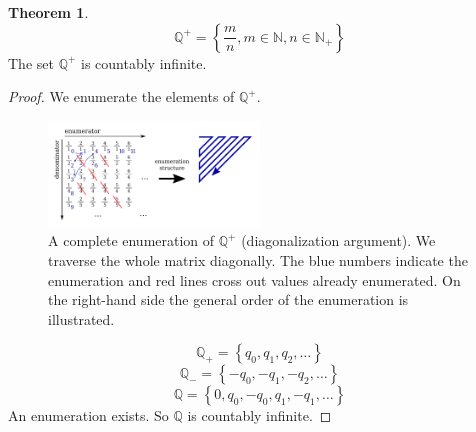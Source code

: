 \documentclass[a4paper,landscape,twocolumn]{article}
\theoremstyle{definition}
\newtheorem{theorem}{Theorem}
\newcommand\set[1]{\left\{#1\right\}}
\begin{document}
\begin{theorem}
  \[ \mathbb Q^+ = \set{\frac mn, m \in \mathbb N, n \in \mathbb N_+} \]
  The set $\mathbb Q^+$ is countably infinite.
\end{theorem}

\begin{proof}
  We enumerate the elements of $\mathbb Q^+$.

  \begin{figure}[!h]
    \begin{center}
      \includegraphics[width=0.5\textwidth]{img/enumeration_of_Q.pdf}
      \caption{
        A complete enumeration of $\mathbb Q^+$ (diagonalization argument).
        We traverse the whole matrix diagonally. The blue numbers indicate the
        enumeration and red lines cross out values already enumerated.
        On the right-hand side the general order of the enumeration is illustrated.
      }
    \end{center}
  \end{figure}

  \[ \mathbb Q_+ = \set{q_0, q_1, q_2, \ldots} \]
  \[ \mathbb Q_- = \set{-q_0, -q_1, -q_2, \ldots} \]
  \[ \mathbb Q = \set{0, q_0, -q_0, q_1, -q_1, \ldots} \]
  An enumeration exists. So $\mathbb Q$ is countably infinite.
\end{proof}
\end{document}
